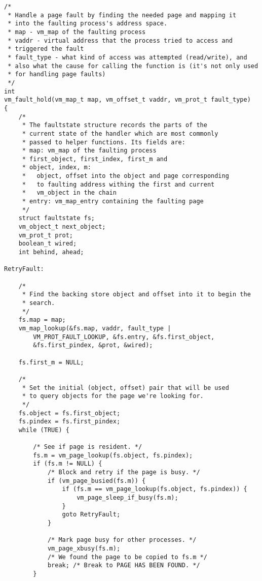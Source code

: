 \documentclass[shortabstract, english]{iithesis}
\newenvironment{code}{}{}
\begin{document}
\begin{code}
\begin{verbatim}
/*
 * Handle a page fault by finding the needed page and mapping it
 * into the faulting process's address space.
 * map - vm_map of the faulting process
 * vaddr - virtual address that the process tried to access and
 * triggered the fault
 * fault_type - what kind of access was attempted (read/write), and
 * also what the cause for calling the function is (it's not only used
 * for handling page faults)
 */
int
vm_fault_hold(vm_map_t map, vm_offset_t vaddr, vm_prot_t fault_type)
{
    /*
     * The faultstate structure records the parts of the
     * current state of the handler which are most commonly
     * passed to helper functions. Its fields are:
     * map: vm_map of the faulting process
     * first_object, first_index, first_m and
     * object, index, m:
     *   object, offset into the object and page corresponding
     *   to faulting address withing the first and current
     *   vm_object in the chain
     * entry: vm_map_entry containing the faulting page
     */
    struct faultstate fs;
    vm_object_t next_object;
    vm_prot_t prot;
    boolean_t wired;
    int behind, ahead;

RetryFault:

    /*
     * Find the backing store object and offset into it to begin the
     * search.
     */
    fs.map = map;
    vm_map_lookup(&fs.map, vaddr, fault_type |
        VM_PROT_FAULT_LOOKUP, &fs.entry, &fs.first_object,
        &fs.first_pindex, &prot, &wired);

    fs.first_m = NULL;

    /*
     * Set the initial (object, offset) pair that will be used
     * to query objects for the page we're looking for.
     */
    fs.object = fs.first_object;
    fs.pindex = fs.first_pindex;
    while (TRUE) {

        /* See if page is resident. */
        fs.m = vm_page_lookup(fs.object, fs.pindex);
        if (fs.m != NULL) {
            /* Block and retry if the page is busy. */
            if (vm_page_busied(fs.m)) {
                if (fs.m == vm_page_lookup(fs.object, fs.pindex)) {
                    vm_page_sleep_if_busy(fs.m);
                }
                goto RetryFault;
            }

            /* Mark page busy for other processes. */
            vm_page_xbusy(fs.m);
            /* We found the page to be copied to fs.m */
            break; /* Break to PAGE HAS BEEN FOUND. */
        }


\end{verbatim}
\end{code}
\end{document}
